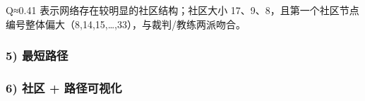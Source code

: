 \begin{Shaded}
\begin{Highlighting}[]
\end{Highlighting}
\end{Shaded}

Q≈0.41 表示网络存在较明显的社区结构；社区大小
17、9、8，且第一个社区节点编号整体偏大（8,14,15,\ldots,33），与裁判/教练两派吻合。

\subsubsection{5) 最短路径}\label{ux6700ux77edux8defux5f84}

\begin{Shaded}
\begin{Highlighting}[]
\OperatorTok{=}\OperatorTok{=}\OperatorTok{=}\NormalTok{)}
\NormalTok{(}
\NormalTok{(}\NormalTok{, }\NormalTok{))}
\end{Highlighting}
\end{Shaded}

\begin{Shaded}
\begin{Highlighting}[]
\end{Highlighting}
\end{Shaded}

\subsubsection{6) 社区 +
路径可视化}\label{ux793eux533a-ux8defux5f84ux53efux89c6ux5316}


